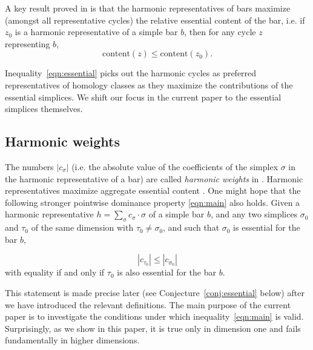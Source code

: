 \documentclass[11pt]{amsart}
\theoremstyle{theorem}
\theoremstyle{remark}
\theoremstyle{definition}
\newcommand{\econt}{\mathrm{content}}
\begin{document}
A key result proved in \cite{Basu-Cox}
is that the harmonic 
representatives of bars maximize (amongst all  representative cycles)
the relative essential content of the bar, 
i.e.
if $z_0$ is a harmonic representative of a simple bar $b$,
then for any cycle $z$  representing $b$,
\begin{equation}
\label{eqn:essential}
\econt(z) \leq \econt(z_0).
\end{equation}

Inequality~\eqref{eqn:essential} picks out the harmonic cycles as preferred
representatives of homology classes as they maximize the contributions of 
the essential simplices. 
We shift our focus in the current paper to the essential simplices themselves.

\subsection{Harmonic weights}
The numbers $|c_\sigma|$ (i.e. the absolute value of the coefficients of the 
simplex $\sigma$ in the harmonic representative of a bar) are called 
\emph{harmonic weights} in \cite{Gurnari-et-al}. 
Harmonic representatives maximize aggregate essential content \cite{Basu-Cox}. One might hope that the following stronger pointwise dominance property
\eqref{eqn:main} also holds.
Given a harmonic representative $h = \sum_{\sigma} c_\sigma \cdot \sigma$ of a simple bar $b$,
and any two simplices $\sigma_0$ and $\tau_0$ of the same dimension 
with $\tau_0 \neq \sigma_0$, and 
such that $\sigma_0$ is essential for the bar $b$,

\begin{equation}
\label{eqn:main}
|c_{\tau_0}| \leq |c_{\sigma_0}|
\end{equation}
with equality if and only if $\tau_0$ is also essential for the bar $b$.

This statement is made precise later (see Conjecture~\ref{conj:essential} below) after we have introduced the relevant definitions. The main purpose of the current paper is to investigate the conditions under which  inequality~\eqref{eqn:main} is valid. 
Surprisingly, as we show in this paper,
it is true only in dimension one and fails fundamentally in higher dimensions.
\end{document}
